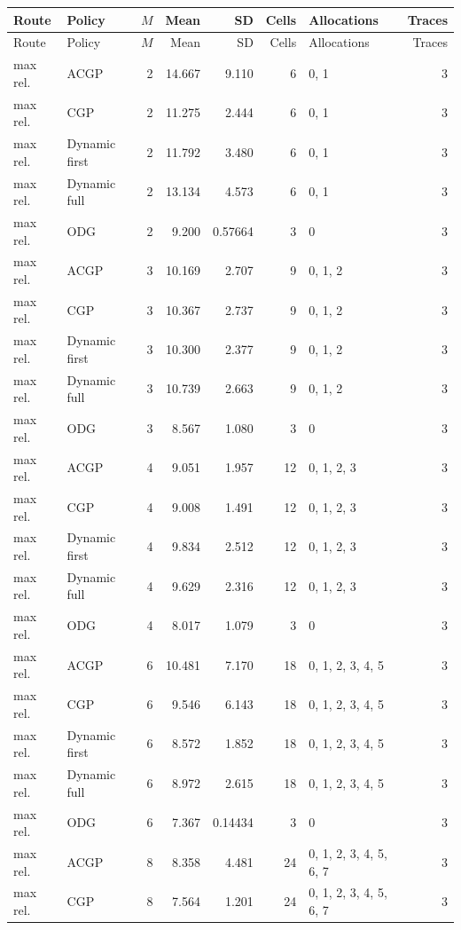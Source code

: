 \documentclass[10pt,a4paper]{article}
\begin{document}
\tiny\setlength{\tabcolsep}{2pt}\begin{longtable}{@{}p{23mm}p{29mm}rrrrp{36mm}r@{}}
\toprule Route & Policy & $M$ & Mean & SD & Cells & Allocations & Traces \\ \midrule\endfirsthead
\toprule Route & Policy & $M$ & Mean & SD & Cells & Allocations & Traces \\ \midrule\endhead
\bottomrule\endfoot
max rel. & ACGP & 2 & 14.667 & 9.110 & 6 & 0, 1 & 3 \\
max rel. & CGP & 2 & 11.275 & 2.444 & 6 & 0, 1 & 3 \\
max rel. & Dynamic first & 2 & 11.792 & 3.480 & 6 & 0, 1 & 3 \\
max rel. & Dynamic full & 2 & 13.134 & 4.573 & 6 & 0, 1 & 3 \\
max rel. & ODG & 2 & 9.200 & 0.57664 & 3 & 0 & 3 \\
max rel. & ACGP & 3 & 10.169 & 2.707 & 9 & 0, 1, 2 & 3 \\
max rel. & CGP & 3 & 10.367 & 2.737 & 9 & 0, 1, 2 & 3 \\
max rel. & Dynamic first & 3 & 10.300 & 2.377 & 9 & 0, 1, 2 & 3 \\
max rel. & Dynamic full & 3 & 10.739 & 2.663 & 9 & 0, 1, 2 & 3 \\
max rel. & ODG & 3 & 8.567 & 1.080 & 3 & 0 & 3 \\
max rel. & ACGP & 4 & 9.051 & 1.957 & 12 & 0, 1, 2, 3 & 3 \\
max rel. & CGP & 4 & 9.008 & 1.491 & 12 & 0, 1, 2, 3 & 3 \\
max rel. & Dynamic first & 4 & 9.834 & 2.512 & 12 & 0, 1, 2, 3 & 3 \\
max rel. & Dynamic full & 4 & 9.629 & 2.316 & 12 & 0, 1, 2, 3 & 3 \\
max rel. & ODG & 4 & 8.017 & 1.079 & 3 & 0 & 3 \\
max rel. & ACGP & 6 & 10.481 & 7.170 & 18 & 0, 1, 2, 3, 4, 5 & 3 \\
max rel. & CGP & 6 & 9.546 & 6.143 & 18 & 0, 1, 2, 3, 4, 5 & 3 \\
max rel. & Dynamic first & 6 & 8.572 & 1.852 & 18 & 0, 1, 2, 3, 4, 5 & 3 \\
max rel. & Dynamic full & 6 & 8.972 & 2.615 & 18 & 0, 1, 2, 3, 4, 5 & 3 \\
max rel. & ODG & 6 & 7.367 & 0.14434 & 3 & 0 & 3 \\
max rel. & ACGP & 8 & 8.358 & 4.481 & 24 & 0, 1, 2, 3, 4, 5, 6, 7 & 3 \\
max rel. & CGP & 8 & 7.564 & 1.201 & 24 & 0, 1, 2, 3, 4, 5, 6, 7 & 3 \\

\end{longtable}
\end{document}
